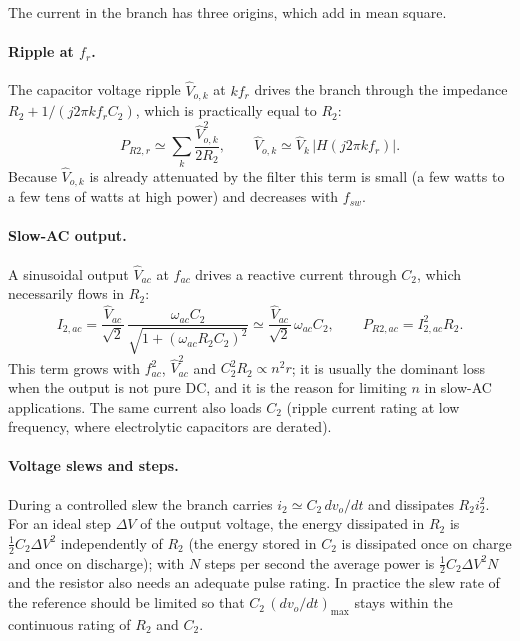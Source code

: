 \documentclass[11pt,a4paper]{article}
\begin{document}
The current in the branch has three origins, which add in mean square.

\paragraph{Ripple at $f_r$.} The capacitor voltage ripple $\hat V_{o,k}$ at $k f_r$ drives
the branch through the impedance $R_2 + 1/(j 2\pi k f_r C_2)$, which is practically
equal to $R_2$:
\begin{equation}
P_{R2,r} \simeq \sum_k \frac{\hat V_{o,k}^2}{2 R_2}, \qquad
\hat V_{o,k} \simeq \hat V_k\,|H(j 2\pi k f_r)|.
\end{equation}
Because $\hat V_{o,k}$ is already attenuated by the filter this term is small (a few watts
to a few tens of watts at high power) and decreases with $f_{sw}$.

\paragraph{Slow-AC output.} A sinusoidal output $\hat V_{ac}$ at $f_{ac}$ drives a
reactive current through $C_2$, which necessarily flows in $R_2$:
\begin{equation}
I_{2,ac} = \frac{\hat V_{ac}}{\sqrt 2}\,\frac{\omega_{ac} C_2}{\sqrt{1 + (\omega_{ac} R_2 C_2)^2}}
\simeq \frac{\hat V_{ac}}{\sqrt 2}\,\omega_{ac} C_2, \qquad
P_{R2,ac} = I_{2,ac}^2 R_2 .
\label{eq:Pac}
\end{equation}
This term grows with $f_{ac}^2$, $\hat V_{ac}^2$ and $C_2^2 R_2 \propto n^2 r$; it is
usually the dominant loss when the output is not pure DC, and it is the reason for
limiting $n$ in slow-AC applications. The same current also loads $C_2$ (ripple current
rating at low frequency, where electrolytic capacitors are derated).

\paragraph{Voltage slews and steps.} During a controlled slew the branch carries
$i_2 \simeq C_2\,dv_o/dt$ and dissipates $R_2 i_2^2$. For an ideal step $\Delta V$ of the
output voltage, the energy dissipated in $R_2$ is $\tfrac12 C_2 \Delta V^2$ independently
of $R_2$ (the energy stored in $C_2$ is dissipated once on charge and once on discharge);
with $N$ steps per second the average power is $\tfrac12 C_2 \Delta V^2 N$ and the
resistor also needs an adequate pulse rating. In practice the slew rate of the reference
should be limited so that $C_2\,(dv_o/dt)_{\max}$ stays within the continuous rating of
$R_2$ and $C_2$.
\end{document}
